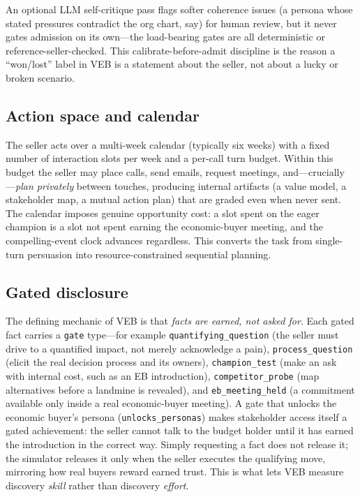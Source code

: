 An optional LLM self-critique pass flags softer coherence issues (a persona whose
stated pressures contradict the org chart, say) for human review, but it never
gates admission on its own---the load-bearing gates are all deterministic or
reference-seller-checked. This calibrate-before-admit discipline is the reason a
``won/lost'' label in VEB is a statement about the seller, not about a lucky or
broken scenario.

\subsection{Action space and calendar}
\label{sec:actions}
The seller acts over a multi-week calendar (typically six weeks) with a fixed
number of interaction slots per week and a per-call turn budget. Within this
budget the seller may place calls, send emails, request meetings, and---crucially
---\emph{plan privately} between touches, producing internal artifacts (a value
model, a stakeholder map, a mutual action plan) that are graded even when never
sent. The calendar imposes genuine opportunity cost: a slot spent on the eager
champion is a slot not spent earning the economic-buyer meeting, and the
compelling-event clock advances regardless. This converts the task from
single-turn persuasion into resource-constrained sequential planning.

\subsection{Gated disclosure}
\label{sec:gates}
The defining mechanic of VEB is that \emph{facts are earned, not asked for}. Each
gated fact carries a \texttt{gate} type---for example \texttt{quantifying\_question}
(the seller must drive to a quantified impact, not merely acknowledge a pain),
\texttt{process\_question} (elicit the real decision process and its owners),
\texttt{champion\_test} (make an ask with internal cost, such as an EB
introduction), \texttt{competitor\_probe} (map alternatives before a landmine is
revealed), and \texttt{eb\_meeting\_held} (a commitment available only inside a
real economic-buyer meeting). A gate that unlocks the economic buyer's persona
(\texttt{unlocks\_personas}) makes stakeholder access itself a gated achievement:
the seller cannot talk to the budget holder until it has earned the introduction
in the correct way. Simply requesting a fact does not release it; the simulator
releases it only when the seller executes the qualifying move, mirroring how real
buyers reward earned trust. This is what lets VEB measure discovery \emph{skill}
rather than discovery \emph{effort}.

